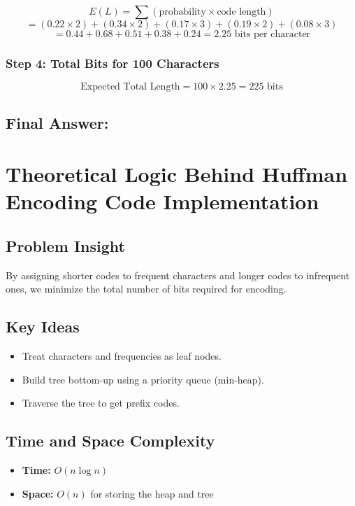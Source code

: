 \documentclass[14pt]{extarticle}
\begin{document}
\[
E(L) = \sum (\text{probability} \times \text{code length})
\]
\[
= (0.22 \times 2) + (0.34 \times 2) + (0.17 \times 3) + (0.19 \times 2) + (0.08 \times 3)
\]
\[
= 0.44 + 0.68 + 0.51 + 0.38 + 0.24 = 2.25 \text{ bits per character}
\]

\subsubsection*{Step 4: Total Bits for 100 Characters}

\[
\text{Expected Total Length} = 100 \times 2.25 = \boxed{225} \text{ bits}
\]

\subsection*{Final Answer:} 



\newpage
\section{Theoretical Logic Behind Huffman Encoding Code Implementation}

\subsection*{Problem Insight}
By assigning shorter codes to frequent characters and longer codes to infrequent ones, we minimize the total number of bits required for encoding.

\subsection*{Key Ideas}
\begin{itemize}
    \item Treat characters and frequencies as leaf nodes.
    \item Build tree bottom-up using a priority queue (min-heap).
    \item Traverse the tree to get prefix codes.
\end{itemize}

\subsection*{Time and Space Complexity}
\begin{itemize}
    \item \textbf{Time:} $O(n \log n)$
    \item \textbf{Space:} $O(n)$ for storing the heap and tree
\end{itemize}
\end{document}
